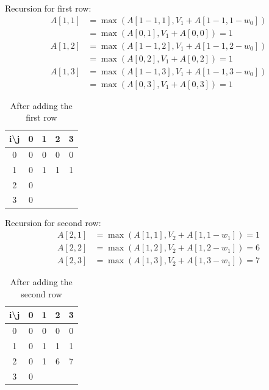 \documentclass[a4paper,11pt]{book}
\begin{document}
\noindent Recursion for first row:
\begin{align*}
    A[1,1] &= \max(A[1-1,1], V_1 + A[1-1,1-w_0])\\
           &= \max(A[0,1], V_1 + A[0,0]) = 1 \\
    A[1,2] &= \max(A[1-1,2], V_1 + A[1-1,2-w_0])\\
           &= \max(A[0,2], V_1 + A[0,2]) = 1 \\
    A[1,3] &= \max(A[1-1,3], V_1 + A[1-1,3-w_0])\\
           &= \max(A[0,3], V_1 + A[0,3]) = 1
\end{align*}

\begin{table}[ht]
\centering
\begin{tabular}{|c|c|c|c|c|}
\hline
i\textbackslash{}j & 0 & 1 & 2 & 3 \\ \hline
0                  & 0 & 0 & 0 & 0 \\ \hline
1                  & 0 & 1 & 1 & 1 \\ \hline
2                  & 0 &   &   &   \\ \hline
3                  & 0 &   &   &   \\ \hline
\end{tabular}
\caption*{After adding the first row}
\end{table}

\noindent Recursion for second row:
\begin{align*}
    A[2,1] &= \max(A[1,1], V_2 + A[1,1-w_1]) = 1\\
    A[2,2] &= \max(A[1,2], V_2 + A[1,2-w_1]) = 6\\
    A[2,3] &= \max(A[1,3], V_2 + A[1,3-w_1]) = 7
\end{align*}

\begin{table}[ht]
\centering
\begin{tabular}{|c|c|c|c|c|}
\hline
i\textbackslash{}j & 0 & 1 & 2 & 3 \\ \hline
0                  & 0 & 0 & 0 & 0 \\ \hline
1                  & 0 & 1 & 1 & 1 \\ \hline
2                  & 0 & 1 & 6 & 7 \\ \hline
3                  & 0 &   &   &   \\ \hline
\end{tabular}
\caption*{After adding the second row}
\end{table}
\end{document}
